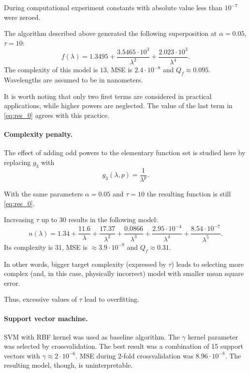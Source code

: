 \documentclass[11pt,a4paper]{article}
\theoremstyle{definition}
\begin{document}
During computational experiment constants with absolute value less than $10^{-7}$
were zeroed.

The algorithm described above generated the following superposition at $\alpha = 0.05$, $\tau = 10$:
\begin{equation}
  f(\lambda) = 1.3495 + \frac{3.5465 \cdot 10^3}{\lambda^2} + \frac{2.023 \cdot 10^3}{\lambda^4}.
  \label{eq:res_0}
\end{equation}
The complexity of this model is $13$, MSE is $2.4 \cdot 10^{-8}$ and $Q_f \approx 0.095$.
Wavelengths are assumed to be in nanometers.

It is worth noting that only two first terms are considered in practical applications, while
higher powers are neglected. The value of the last term in \eqref{eq:res_0}
agrees with this practice.

\paragraph{Complexity penalty.}

The effect of adding odd powers to the elementary function set is studied here by replacing
$g_3$ with 
\[
  g_3(\lambda, p) = \frac{1}{\lambda^p}.
\]

With the same parameters $\alpha = 0.05$ and $\tau = 10$ the resulting function is still
\eqref{eq:res_0}.

Increasing $\tau$ up to 30 results in the following model:
\begin{equation}
  n(\lambda) = 1.34 + \frac{11.6}{\lambda} + \frac{17.37}{\lambda^2} + \frac{0.0866}{\lambda^3} + \frac{2.95 \cdot 10^{-4}}{\lambda^4} + \frac{8.54 \cdot 10^{-7}}{\lambda^5}.
  \label{eq:res_incorrect}
\end{equation}
Its complexity is $31$, MSE is $\approx 3.9 \cdot 10^{-9}$ and $Q_f \approx 0.31$.

In other words, bigger target complexity (expressed by $\tau$) leads to selecting
more complex (and, in this case, physically incorrect) model with smaller mean square error.

Thus, excessive values of $\tau$ lead to overfitting.

\paragraph{Support vector machine.}

SVM with RBF kernel \cite{Vapnik79} was used as baseline algorithm. The $\gamma$ kernel
parameter was selected by crossvalidation. The best result was a combination of 15
support vectors with $\gamma \approx 2 \cdot 10^{-6}$. MSE during 2-fold crossvalidation
was $8.96 \cdot 10^{-8}$. The resulting model, though, is uninterpretable.
\end{document}
